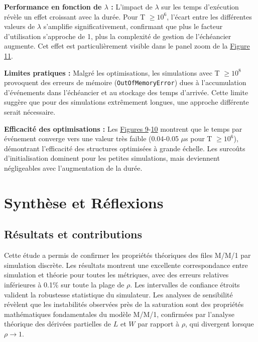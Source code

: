 \documentclass[12pt,a4paper]{article}
\begin{document}
\vspace{0.3cm}
\textbf{Performance en fonction de $\lambda$ :} L'impact de $\lambda$ sur les temps d'exécution révèle un effet croissant avec la durée. Pour T $\geq 10^6$, l'écart entre les différentes valeurs de $\lambda$ s'amplifie significativement, confirmant que plus le facteur d'utilisation s'approche de 1, plus la complexité de gestion de l'échéancier augmente. Cet effet est particulièrement visible dans le panel zoom de la \hyperref[fig:exec_time_lambda]{Figure 11}.

\vspace{0.3cm}
\textbf{Limites pratiques :} Malgré les optimisations, les simulations avec T $\geq 10^8$ provoquent des erreurs de mémoire (\texttt{OutOfMemoryError}) dues à l'accumulation d'événements dans l'échéancier et au stockage des temps d'arrivée. Cette limite suggère que pour des simulations extrêmement longues, une approche différente serait nécessaire.

\vspace{0.3cm}
\textbf{Efficacité des optimisations :} Les \hyperref[fig:exec_time]{Figures 9}-\hyperref[fig:time_per_event]{10} montrent que le temps par événement converge vers une valeur très faible (0.04-0.05 $\mu$s pour T $\geq 10^6$), démontrant l'efficacité des structures optimisées à grande échelle. Les surcoûts d'initialisation dominent pour les petites simulations, mais deviennent négligeables avec l'augmentation de la durée.


\section{Synthèse et Réflexions}

\subsection{Résultats et contributions}

Cette étude a permis de confirmer les propriétés théoriques des files M/M/1 par simulation discrète. Les résultats montrent une excellente correspondance entre simulation et théorie pour toutes les métriques, avec des erreurs relatives inférieures à 0.1\% sur toute la plage de $\rho$. Les intervalles de confiance étroits valident la robustesse statistique du simulateur. Les analyses de sensibilité révèlent que les instabilités observées près de la saturation sont des propriétés mathématiques fondamentales du modèle M/M/1, confirmées par l'analyse théorique des dérivées partielles de $L$ et $W$ par rapport à $\rho$, qui divergent lorsque $\rho \to 1$.
\end{document}
